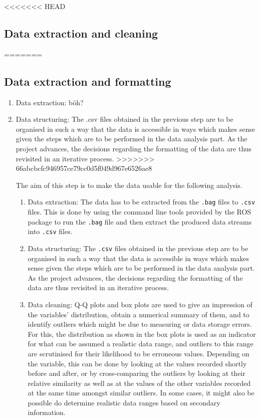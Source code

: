 \documentclass[11pt, UKenglish]{report}
\begin{document}
{<<<<<<< HEAD
\subsection*{Data extraction and cleaning}
=======
\subsection*{Data extraction and formatting}

\begin{enumerate}

	\item{\large{Data extraction:} \normalsize böh? }

	\item{\large{Data structuring:} \normalsize  The .csv files obtained in the previous step are to be organised in such a way that the data is accessible in ways which makes sense given the steps which are to be performed in the data analysis part. As the project advances, the decisions regarding the formatting of the data are thus revisited in an iterative process.}
>>>>>>> 66abcbcfc946957ce79cc0d5f049d967e6526ae8

The aim of this step is to make the data usable for the following analysis. 

\begin{enumerate}

	\item{\large{Data extraction:} \normalsize The data has to be extracted from the \texttt{.bag} files to \texttt{.csv} files. This is done by using the command line tools provided by the ROS package to run the \texttt{.bag} file and then extract the produced data streams into \texttt{.csv} files.} 

	\item{\large{Data structuring:} \normalsize The \texttt{.csv} files obtained in the previous step are to be organised in such a way that the data is accessible in ways which makes sense given the steps which are to be performed in the data analysis part. As the project advances, the decisions regarding the formatting of the data are thus revisited in an iterative process.}

	\item{\large{Data cleaning:} \normalsize Q-Q plots and box plots are used to give an impression of the variables' distribution, obtain a numerical summary of them, and to identify outliers which might be due to measuring or data storage errors. For this, the distribution as shown in the box plots is used as an indicator for what can be assumed a realistic data range, and outliers to this range are scrutinised for their likelihood to be erroneous values. Depending on the variable, this can be done by looking at the values recorded shortly before and after, or by cross-comparing the outliers by looking at their relative similarity as well as at the values of the other variables recorded at the same time amongst similar outliers. In some cases, it might also be possible do determine realistic data ranges based on secondary information.}


\end{enumerate}
\end{enumerate}}
\end{document}
